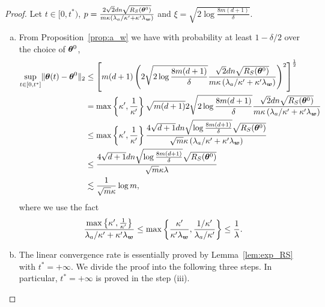 \documentclass[twoside,11pt]{article}
\begin{document}
\begin{proof}
    Let $t\in[0,t^*)$, $p=\frac{2\sqrt{2}dn\sqrt{R_S(\bm{\theta}^0)}}{m\kappa\left(\lambda_a/\kappa'+\kappa'\lambda_{\bm{w}}\right)}$ and $\xi=\sqrt{2\log\frac{8m(d+1)}{\delta}}$.
    \begin{enumerate}[(a)]
        \item From Proposition~\ref{prop:a_w} we have with probability at least $1-\delta/2$ over the choice of $\bm{\theta}^0$,
              \begin{equation*}
                  \begin{aligned}
                      \sup\limits_{t\in[0,t^*]}\lVert\bm{\theta}(t)-\bm{\theta}^0\rVert_2
                       & \leq \left[m(d+1)\left(2\sqrt{2\log\frac{8m(d+1)}{\delta}}\frac{\sqrt{2}dn\sqrt{R_S(\bm{\theta}^0)}}{m\kappa\left(\lambda_a/\kappa'+\kappa'\lambda_{\bm{w}}\right)}\right)^2\right]^{\frac{1}{2}}      \\
                       & =\max\left\{\kappa',\frac{1}{\kappa'}\right\}\sqrt{m(d+1)}2\sqrt{2\log\frac{8m(d+1)}{\delta}}\frac{\sqrt{2}dn\sqrt{R_S(\bm{\theta}^0)}}{m\kappa\left(\lambda_a/\kappa'+\kappa'\lambda_{\bm{w}}\right)} \\
                       & \leq\max\left\{\kappa',\frac{1}{\kappa'}\right\}\frac{4\sqrt{d+1}dn\sqrt{\log\frac{8m(d+1)}{\delta}}\sqrt{R_S(\bm{\theta}^0)}}{\sqrt{m}\kappa\left(\lambda_a/\kappa'+\kappa'\lambda_{\bm{w}}\right)}   \\
                       & \leq\frac{4\sqrt{d+1}dn\sqrt{\log\frac{8m(d+1)}{\delta}}\sqrt{R_S(\bm{\theta}^0)}}{\sqrt{m}\kappa\lambda}                                                                                           \\
                       & \lesssim \frac{1}{\sqrt{m}\kappa}\log m,
                  \end{aligned}
              \end{equation*}
              where we use the fact
              \begin{equation*}
                  \frac{\max\left\{\kappa',\frac{1}{\kappa'}\right\}}{\lambda_a/\kappa'+\kappa'\lambda_{\bm{w}}}\leq\max\left\{\frac{\kappa'}{\kappa'\lambda_{\bm{w}}},\frac{1/\kappa'}{\lambda_a/\kappa'}\right\}\leq\frac{1}{\lambda}.
              \end{equation*}
        \item The linear convergence rate is essentially proved by Lemma~\ref{lem:exp_RS} with $t^* = +\infty$. We divide the proof into the following three steps. In particular, $t^*=+\infty$ is proved in the step (iii).
              \begin{enumerate}[(i)]

\end{enumerate}
\end{enumerate}
\end{proof}
\end{document}
